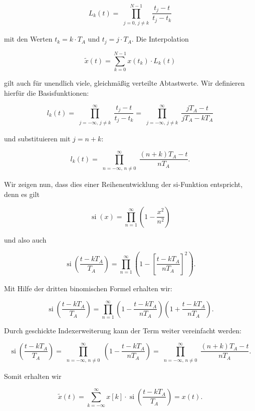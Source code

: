 $$
L_k(t) = \prod_{\substack{j=0,\, j\neq k}}^{N-1} \frac{t_j - t}{t_j - t_k}
$$

mit den Werten $t_k = k \cdot T_A$ und $t_j = j \cdot T_A$. Die Interpolation

$$
\tilde{x}(t) = \sum_{k=0}^{N-1} x(t_k) \cdot L_k(t)
$$

gilt auch für unendlich viele, gleichmäßig verteilte Abtastwerte. Wir definieren hierfür die Basisfunktionen:

$$
l_k(t) = \prod_{\substack{j=-\infty,\, j\neq k}}^{\infty} \frac{t_j - t}{t_j - t_k}
= \prod_{\substack{j=-\infty,\, j\neq k}}^{\infty} \frac{jT_A - t}{jT_A - kT_A}
$$

und substituieren mit $j = n + k$:

$$
l_k(t) = \prod_{\substack{n=-\infty,\, n\neq 0}}^{\infty} \frac{(n+k)T_A - t}{nT_A}.
$$

\begin{beweis}
Wir zeigen nun, dass dies einer Reihenentwicklung der si-Funktion entspricht, denn es gilt

$$
\operatorname{si}(x) = \prod_{n=1}^{\infty} \left(1 - \frac{x^2}{n^2}\right)
$$

und also auch

$$
\operatorname{si}\!\left(\frac{t - kT_A}{T_A}\right) = \prod_{n=1}^{\infty} \left(1 - \left[\frac{t - kT_A}{nT_A}\right]^2\right).
$$

Mit Hilfe der dritten binomischen Formel erhalten wir:

$$
\operatorname{si}\!\left(\frac{t - kT_A}{T_A}\right) = \prod_{n=1}^{\infty} \left(1 - \frac{t - kT_A}{nT_A}\right)\left(1 + \frac{t - kT_A}{nT_A}\right).
$$

Durch geschickte Indexerweiterung kann der Term weiter vereinfacht werden:

$$
\operatorname{si}\!\left(\frac{t - kT_A}{T_A}\right)
= \prod_{\substack{n=-\infty,\, n\neq 0}}^{\infty} \left(1 - \frac{t - kT_A}{nT_A}\right)
= \prod_{\substack{n=-\infty,\, n\neq 0}}^{\infty} \frac{(n+k)T_A - t}{nT_A}.
$$

Somit erhalten wir

$$
\tilde{x}(t) = \sum_{k=-\infty}^{\infty} x[k] \cdot \operatorname{si}\!\left(\frac{t - kT_A}{T_A}\right) = x(t).
$$
\end{beweis}


